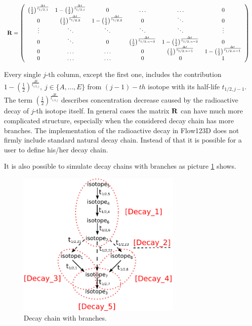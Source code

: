 \begin{tiny}\[
   \begin{array}{l}
    {\bf R} = \left(
    \begin{array}{cccccc}
     \left(\frac{1}{2}\right)^\frac{\Delta t}{t_{1/2,1}} & 1 - \left(\frac{1}{2}\right)^\frac{\Delta t}{t_{1/2,i}} & 0 & \hdots & \hdots & 0\\
     0 & \left(\frac{1}{2}\right)^\frac{\Delta t}{t_{1/2,2}} & 1 - \left(\frac{1}{2}\right)^\frac{\Delta t}{t_{1/2,2}} & 0 & \ddots & 0 \\
     \vdots & \ddots & \ddots & \ddots & \ddots & \vdots\\
     0 & \ddots & 0 & \left(\frac{1}{2}\right)^\frac{\Delta t}{t_{1/2,n-2}} & 1 - \left(\frac{1}{2}\right)^\frac{\Delta t}{t_{1/2,n-2}} & 0 \\
     0 & \hdots & \hdots & 0 & \left(\frac{1}{2}\right)^\frac{\Delta t}{t_{1/2,n-1}} & 1 - \left(\frac{1}{2}\right)^\frac{\Delta t}{t_{1/2,n-1}}\\
     0 & \hdots & \hdots & 0 & 0 & 1
    \end{array}\right)
   \end{array}
\]\end{tiny}

Every single $j$-th column, except the first one, includes the contribution $1 - \left(\frac{1}{2}\right)^\frac{\Delta t}{t_{1/2,j}},~j\in\{A,\ldots, E\}$ from $(j-1)-th$
isotope with its half-life $t_{1/2,j-1}$. The term $\left(\frac{1}{2}\right)^\frac{\Delta t}{t_{1/2,j}}$ describes concentration decrease caused by the radioactive decay of $j$-th isotope itself. In general cases the matrix ${\bf R}$ can have much more complicated structure, especially when the considered decay chain has more branches.
The implementation of the radioactive decay in Flow123D does not firmly include standard natural decay chain. Instead of that it is possible for a user to define his/her decay chain.

It is also possible to simulate decay chains with branches as picture \ref{pic:dec_branches} shows.

\begin{figure}[htb]
 \centering
 \includegraphics[width = 8cm]{./decay_chain}
 \caption{Decay chain with branches.}
 \label{pic:dec_branches}
\end{figure}


